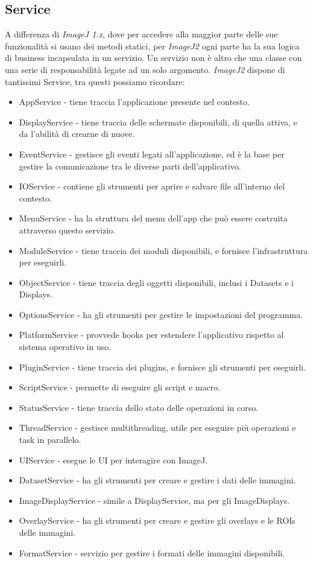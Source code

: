 \subsection{Service}
\noindent A differenza di \textit{ImageJ 1.x}, dove per accedere alla maggior parte delle sue funzionalità si usano dei metodi statici, per \textit{ImageJ2} ogni parte ha la sua logica di business incapsulata in un servizio. Un servizio non è altro che una classe con una serie di responsabilità legate ad un solo argomento. \textit{ImageJ2} dispone di tantissimi Service, tra questi possiamo ricordare:
\begin{itemize}
    \item AppService - tiene traccia l'applicazione presente nel contesto.
    \item DisplayService - tiene traccia delle schermate disponibili, di quella attiva, e da l'abilità di crearne di nuove.
    \item EventService - gestisce gli eventi legati all'applicazione, ed è la base per gestire la comunicazione tra le diverse parti dell'applicativo.
    \item IOService - contiene gli strumenti per aprire e salvare file all'interno del contesto.
    \item MenuService - ha la struttura del menu dell'app che può essere costruita attraverso questo servizio.
    \item ModuleService - tiene traccia dei moduli disponibili, e fornisce l'infrastruttura per eseguirli.
    \item ObjectService - tiene traccia degli oggetti disponibili, inclusi i Datasets e i Displays.
    \item OptionsService - ha gli strumenti per gestire le impostazioni del programma.
    \item PlatformService - provvede hooks per estendere l'applicativo rispetto al sistema operativo in uso.
    \item PluginService - tiene traccia dei plugins, e fornisce gli strumenti per eseguirli.
    \item ScriptService - permette di eseguire gli script e macro.
    \item StatusService - tiene traccia dello stato delle operazioni in corso.
    \item ThreadService - gestisce multithreading, utile per eseguire più operazioni e task in parallelo.
    \item UIService - esegue le UI per interagire con ImageJ.
    \item DatasetService - ha gli strumenti per creare e gestire i dati delle immagini.
    \item ImageDisplayService - simile a DisplayService, ma per gli ImageDisplays.
    \item OverlayService - ha gli strumenti per creare e gestire gli overlays e le ROIs delle immagini.
    \item FormatService - servizio per gestire i formati delle immagini disponibili.
\end{itemize}
    


